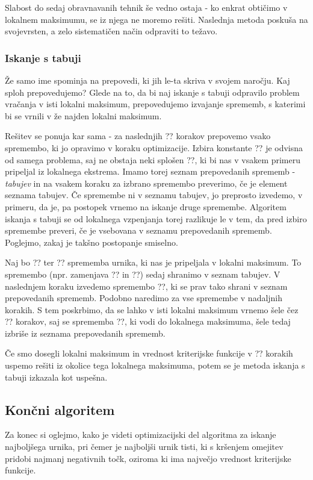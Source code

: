 \documentclass[a4paper,10pt]{article}
\begin{document}
Slabost do sedaj obravnavanih tehnik še vedno ostaja - ko enkrat obtičimo v lokalnem
maksimumu, se iz njega ne moremo rešiti. Naslednja metoda poskuša na svojevrsten, a zelo
sistematičen način odpraviti to težavo.

\subsubsection{Iskanje s tabuji}

Že samo ime spominja na prepovedi, ki jih le-ta skriva v svojem naročju. Kaj sploh prepovedujemo?
Glede na to, da bi naj iskanje s tabuji odpravilo problem vračanja v isti lokalni maksimum,
prepovedujemo izvajanje sprememb, s katerimi bi se vrnili v že najden lokalni maksimum.

Rešitev se ponuja kar sama - za naslednjih ?? korakov prepovemo vsako spremembo, ki jo
opravimo v koraku optimizacije. Izbira konstante ?? je odvisna od samega problema, saj
ne obstaja neki splošen ??, ki bi nas v vsakem primeru pripeljal iz lokalnega ekstrema.
Imamo torej seznam prepovedanih sprememb - \emph{tabujev} in na vsakem koraku za izbrano
spremembo preverimo, če je element seznama tabujev. Če spremembe ni v seznamu tabujev, jo
preprosto izvedemo, v primeru, da je, pa postopek vrnemo na iskanje druge spremembe.
Algoritem iskanja s tabuji se od lokalnega vzpenjanja torej razlikuje le v tem, da pred
izbiro spremembe preveri, če je vsebovana v seznamu prepovedanih sprememb. Poglejmo, zakaj
je takšno postopanje smiselno.

Naj bo ?? ter ?? sprememba urnika, ki nas je pripeljala v lokalni maksimum. To
spremembo (npr. zamenjava ?? in ??) sedaj shranimo v
seznam tabujev. V naslednjem koraku izvedemo spremembo ??, ki se prav tako shrani v
seznam prepovedanih sprememb. Podobno naredimo za vse spremembe v nadaljnih korakih. S
tem poskrbimo, da se lahko v isti lokalni maksimum vrnemo šele čez ?? korakov, saj
se sprememba ??, ki vodi do lokalnega maksimuma, šele tedaj izbriše iz seznama
prepovedanih sprememb.

Če smo dosegli lokalni maksimum in vrednost kriterijske funkcije v ?? korakih uspemo
rešiti iz okolice tega lokalnega maksimuma, potem se je metoda iskanja s tabuji izkazala
kot uspešna.

\subsection{Končni algoritem}

Za konec si oglejmo, kako je videti optimizacijski del algoritma za iskanje najboljšega
urnika, pri čemer je najboljši urnik tisti, ki s kršenjem omejitev pridobi najmanj negativnih
točk, oziroma ki ima največjo vrednost kriterijske funkcije.
\end{document}
